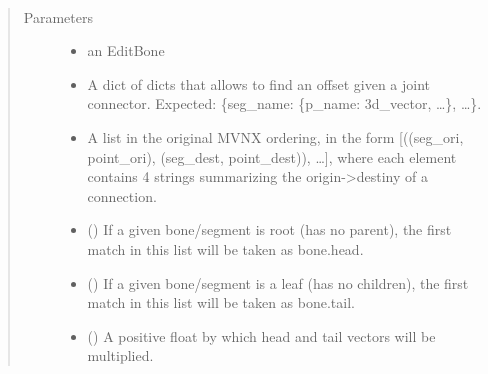 \documentclass[letterpaper,10pt,english,openany,oneside]{sphinxmanual}
\begin{document}
\begin{fulllineitems}
\label{\detokenize{io_anim_mvnx:io_anim_mvnx.mvnx_import.set_bone_head_and_tail}}~\begin{quote}\begin{description}
\item[{Parameters}] \leavevmode\begin{itemize}
\item {} 
 \textendash{} an EditBone

\item {} 
 \textendash{} A dict of dicts that allows to find an offset given
a joint connector. Expected: \{seg\_name: \{p\_name: 3d\_vector, …\}, …\}.

\item {} 
 \textendash{} A list in the original MVNX ordering, in the form
{[}((seg\_ori, point\_ori), (seg\_dest, point\_dest)), …{]}, where each element
contains 4 strings summarizing the origin-\textgreater{}destiny of a connection.

\item {} 
 () \textendash{} If a given bone/segment is root (has no parent),
the first match in this list will be taken as bone.head.

\item {} 
 () \textendash{} If a given bone/segment is a leaf (has no
children), the first match in this list will be taken as bone.tail.

\item {} 
 () \textendash{} A positive float by which head and tail vectors will
be multiplied.

\end{itemize}

\end{description}\end{quote}


\end{fulllineitems}
\end{document}
